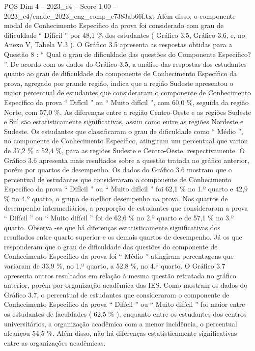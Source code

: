 \begin{textsample}{POS Dim 4 – 2023\_c4 – Score 1.00 – 2023\_c4/enade\_2023\_eng\_comp\_e7383ab66f.txt}
Além disso, o componente modal de Conhecimento Específico da prova foi considerado com grau de dificuldade “ Difícil ” por 48,1 \% dos estudantes ( Gráfico 3.5, Gráfico 3.6, e, no Anexo V, Tabela V.3 ).
O Gráfico 3.5 apresenta as respostas obtidas para a Questão 8 : “ Qual o grau de dificuldade das questões do Componente Específico? ”.
De acordo com os dados do Gráfico 3.5, a análise das respostas dos estudantes quanto ao grau de dificuldade do componente de Conhecimento Específico da prova, agregado por grande região, indica que a região Sudeste apresentou o maior percentual de estudantes que consideraram o componente de Conhecimento Específico da prova “ Difícil ” ou “ Muito difícil ”, com 60,0 \%, seguida da região Norte, com 57,0 \%.
As diferenças entre a região Centro-Oeste e as regiões Sudeste e Sul são estatisticamente significativas, assim como entre as regiões Nordeste e Sudeste.
Os estudantes que classificaram o grau de dificuldade como “ Médio ”, no componente de Conhecimento Específico, atingiram um percentual que variou de 37,2 \% a 52,4 \%, para as regiões Sudeste e Centro-Oeste, respectivamente.
O Gráfico 3.6 apresenta mais resultados sobre a questão tratada no gráfico anterior, porém por quartos de desempenho.
Os dados do Gráfico 3.6 mostram que o percentual de estudantes que consideraram o componente de Conhecimento Específico da prova “ Difícil ” ou “ Muito difícil ” foi 62,1 \% no 1.º quarto e 42,9 \% no 4.º quarto, o grupo de melhor desempenho na prova.
Nos quartos de desempenho intermediários, a proporção de estudantes que consideraram a prova “ Difícil ” ou “ Muito difícil ” foi de 62,6 \% no 2.º quarto e de 57,1 \% no 3.º quarto.
Observa -se que há diferenças estatisticamente significativas dos resultados entre quarto superior e os demais quartos de desempenho.
Já os que responderam que o grau de dificuldade das questões do componente de Conhecimento Específico da prova foi “ Médio ” atingiram percentagens que variaram de 33,9 \%, no 1.º quarto, a 52,8 \%, no 4.º quarto.
O Gráfico 3.7 apresenta outros resultados em relação à mesma questão retratada no gráfico anterior, porém por organização acadêmica das IES.
Como mostram os dados do Gráfico 3.7, o percentual de estudantes que consideraram o componente de Conhecimento Específico da prova “ Difícil ” ou “ Muito difícil ” foi maior entre os estudantes de faculdades ( 62,5 \% ), enquanto entre os estudantes dos centros universitários, a organização acadêmica com a menor incidência, o percentual alcançou 54,5 \%.
Além disso, não há diferenças estatisticamente significativas entre as organizações acadêmicas.

\end{textsample}
